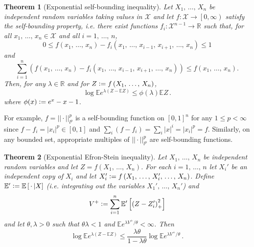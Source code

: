 \documentclass[reqno]{amsproc}
\newtheorem{theorem}{Theorem}
\newcommand{\defeq}{\vcentcolon=} %
\newcommand{\R}{\mathbb{R}}
\newcommand{\E}{\mathbb{E}} %
\begin{document}
\begin{theorem}[Exponential self-bounding inequality]
	\label{thm:exp_self_bound_ineq}
	Let $X_1,\,\dots,\,X_n$ be independent random variables taking values in $ \mathcal{X} $ and let $f: \mathcal{X} \to \left[0,\infty\right)$ satisfy the self-bounding property,
	i.e. there exist functions $f_i : \mathcal{X}^{n-1} \to \R$ such that, for all $x_1,\,\dots,\,x_n\in \mathcal{X} $ and all $i=1,\,\dots,\,n$,
	\begin{equation*}
		0 \leq f \left( x_1,\,\dots,\,x_n \right) - f_i \left( x_1,\,\dots,\,x_{i-1},\,x_{i+1},\,\dots,\,x_n \right) \leq 1
	\end{equation*}
	and
	\begin{equation*}
		\sum_{i=1}^n \left(
			f \left( x_1,\,\dots,\,x_n \right) - f_i \left( x_1,\,\dots,\,x_{i-1},\,x_{i+1},\,\dots,\,x_n \right)
		\right) \leq f \left( x_1,\,\dots,\,x_n \right).
	\end{equation*}
	Then, for any $\lambda\in\R$ and for $Z \defeq f \left( X_1,\,\dots,\,X_n \right)$,
	\begin{equation*}
		\log \E e^{\lambda \left( Z-\E Z \right)} \leq \phi(\lambda) \E Z\,.
	\end{equation*}
	where $\phi(x) \defeq e^x - x - 1$.
\end{theorem}
	For example, $f = {||\cdot||}_{l^p}^p$ is a self-bounding function on ${ \left[ 0,1 \right] }^n$ for any $1\leq p < \infty$ since 
		$f-f_i = {|x_i|}^p \in \left[ 0,1 \right]$
	and
		$\sum_i \left( f-f_i \right) = \sum_i {|x|}^i = {|x_i|}^p = f$.
	Similarly, on any bounded set, appropriate multiples of ${||\cdot||}_{l^p}^p$ are self-bounding functions.
\begin{theorem}[Exponential Efron-Stein inequality]
	\label{thm:exp_efron_stein}
	Let $X_1,\,\dots,\,X_n$ be independent random variables and let $Z = f \left( X_1,\,\dots,\,X_n \right)$.
	For each $i=1,\,\dots,\,n$ let $X_i'$ be an independent copy of $X_i$ and let $X_i' \defeq f \left( X_1,\,\dots,\,X_i',\,\dots,\,X_n \right)$.
	Define $\E' \defeq \E \left[ \,\cdot\, | X \right]$ (i.e. integrating out the variables $X_1',\,\dots,\,X_n'$) and
	\begin{equation*}
		V^+ \defeq \sum_{i=1}^n \E' \left[ {\left( Z - Z_i' \right)}_+^2 \right]
	\end{equation*}
	and let $\theta, \lambda > 0$ such that $\theta\lambda < 1$ and $\E e^{\lambda V^+ / \theta} < \infty$. Then
	\begin{equation*}
		\log\E e^{\lambda \left( Z - \E Z \right)} \leq \frac{\lambda\theta}{1-\lambda\theta} \log\E e^{\lambda V^+ / \theta}\,.
	\end{equation*}
\end{theorem}
\end{document}

